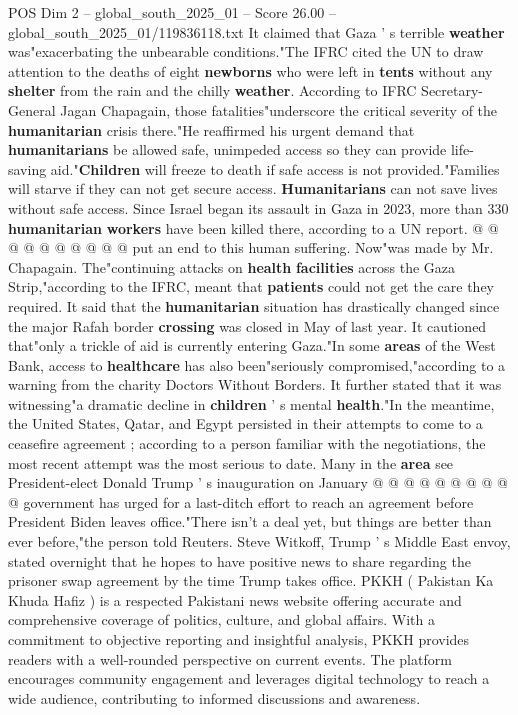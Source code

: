 \begin{textsample}{POS Dim 2 – global\_south\_2025\_01 – Score 26.00 – global\_south\_2025\_01/119836118.txt}
It claimed that Gaza ' s terrible \textbf{weather} was"exacerbating the unbearable conditions."The IFRC cited the UN to draw attention to the deaths of eight \textbf{newborns} who were left in \textbf{tents} without any \textbf{shelter} from the rain and the chilly \textbf{weather}.
According to IFRC Secretary-General Jagan Chapagain, those fatalities"underscore the critical severity of the \textbf{humanitarian} crisis there."He reaffirmed his urgent demand that \textbf{humanitarians} be allowed safe, unimpeded access so they can provide life-saving aid."\textbf{Children} will freeze to death if safe access is not provided."Families will starve if they can not get secure access. \textbf{Humanitarians} can not save lives without safe access.
Since Israel began its assault in Gaza in 2023, more than 330 \textbf{humanitarian} \textbf{workers} have been killed there, according to a UN report. @ @ @ @ @ @ @ @ @ @ put an end to this human suffering.
Now"was made by Mr.
Chapagain.
The"continuing attacks on \textbf{health} \textbf{facilities} across the Gaza Strip,"according to the IFRC, meant that \textbf{patients} could not get the care they required.
It said that the \textbf{humanitarian} situation has drastically changed since the major Rafah border \textbf{crossing} was closed in May of last year.
It cautioned that"only a trickle of aid is currently entering Gaza."In some \textbf{areas} of the West Bank, access to \textbf{healthcare} has also been"seriously compromised,"according to a warning from the charity Doctors Without Borders.
It further stated that it was witnessing"a dramatic decline in \textbf{children} ' s mental \textbf{health}."In the meantime, the United States, Qatar, and Egypt persisted in their attempts to come to a ceasefire agreement ; according to a person familiar with the negotiations, the most recent attempt was the most serious to date.
Many in the \textbf{area} see President-elect Donald Trump ' s inauguration on January @ @ @ @ @ @ @ @ @ @ government has urged for a last-ditch effort to reach an agreement before President Biden leaves office."There isn't a deal yet, but things are better than ever before,"the person told Reuters.
Steve Witkoff, Trump ' s Middle East envoy, stated overnight that he hopes to have positive news to share regarding the prisoner swap agreement by the time Trump takes office.
PKKH ( Pakistan Ka Khuda Hafiz ) is a respected Pakistani news website offering accurate and comprehensive coverage of politics, culture, and global affairs.
With a commitment to objective reporting and insightful analysis, PKKH provides readers with a well-rounded perspective on current events.
The platform encourages community engagement and leverages digital technology to reach a wide audience, contributing to informed discussions and awareness.

\end{textsample}

